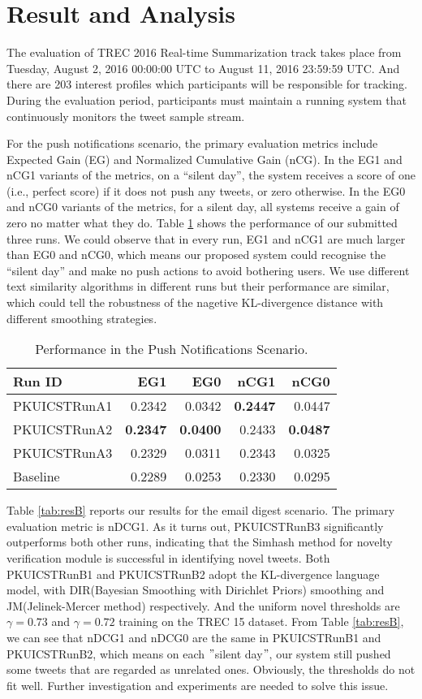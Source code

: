\section{Result and Analysis}
The evaluation of TREC 2016 Real-time Summarization track takes place from
Tuesday, August 2, 2016 00:00:00 UTC to August 11, 2016 23:59:59 UTC.
And there are 203 interest profiles which participants will be responsible for tracking.
During the evaluation period, participants must maintain a running system
that continuously monitors the tweet sample stream.

For the push notifications scenario, the primary evaluation metrics
include Expected Gain (EG) and Normalized Cumulative Gain (nCG).
In the EG1 and nCG1 variants of the metrics, on a ``silent day'',
the system receives a score of one (i.e., perfect score) if it does not push any tweets,
or zero otherwise. In the EG0 and nCG0 variants of the metrics, for a silent day,
all systems receive a gain of zero no matter what they do.
Table \ref{tab:resA} shows the performance of our submitted three runs.
We could observe that in every run, EG1 and nCG1 are much larger than EG0 and nCG0,
which means our proposed system could recognise the ``silent day''
and make no push actions to avoid bothering users.
We use different text similarity algorithms in different runs
but their performance are similar, which could tell the robustness
of the nagetive KL-divergence distance with different smoothing strategies.

\begin{table}[htbp]
\centering
\caption{Performance in the Push Notifications Scenario.}
\label{tab:resA}
\begin{tabular}{lrrrr}
\hline
Run ID&EG1&EG0&nCG1&nCG0\\
\hline
PKUICSTRunA1&0.2342&0.0342&\textbf{0.2447}&0.0447\\
PKUICSTRunA2&\textbf{0.2347}&\textbf{0.0400}&0.2433&\textbf{0.0487}\\
PKUICSTRunA3&0.2329&0.0311&0.2343&0.0325\\
Baseline&0.2289&0.0253&0.2330&0.0295\\
\hline
\end{tabular}
\end{table}

Table \ref{tab:resB} reports our results for the email digest scenario.
The primary evaluation metric is nDCG1.
As it turns out, PKUICSTRunB3 significantly outperforms both other runs,
indicating that the Simhash method for novelty verification module is successful in identifying novel tweets.
Both PKUICSTRunB1 and PKUICSTRunB2 adopt the KL-divergence language model,
with DIR(Bayesian Smoothing with Dirichlet Priors) smoothing and JM(Jelinek-Mercer method) respectively.
And the uniform novel thresholds are $\gamma=0.73$ and $\gamma=0.72$ training on the TREC 15 dataset.
From Table \ref{tab:resB}, we can see that nDCG1 and nDCG0 are the same in PKUICSTRunB1 and PKUICSTRunB2,
which means on each $"$silent day$"$, our system still pushed some tweets that are regarded as unrelated ones.
Obviously, the thresholds do not fit well. Further investigation and experiments are needed to solve this issue.

